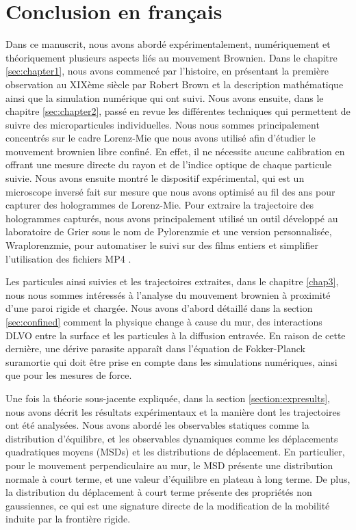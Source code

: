 \section{Conclusion en français}

Dans ce manuscrit, nous avons abordé expérimentalement, numériquement et théoriquement plusieurs aspects liés au mouvement Brownien. Dans le chapitre \ref{sec:chapter1}, nous avons commencé par l'histoire, en présentant la première observation au XIXème siècle par Robert Brown et la description mathématique ainsi que la simulation numérique qui ont suivi. Nous avons ensuite, dans le chapitre \ref{sec:chapter2}, passé en revue les différentes techniques qui permettent de suivre des microparticules individuelles. Nous nous sommes principalement concentrés sur le cadre Lorenz-Mie que nous avons utilisé afin d'étudier le mouvement brownien libre confiné. En effet, il ne nécessite aucune calibration en offrant une mesure directe du rayon et de l'indice optique de chaque particule suivie. Nous avons ensuite montré le dispositif expérimental, qui est un microscope inversé fait sur mesure que nous avons optimisé au fil des ans pour capturer des hologrammes de Lorenz-Mie. Pour extraire la trajectoire des hologrammes capturés, nous avons principalement utilisé un outil développé au laboratoire de Grier sous le nom de Pylorenzmie \href{https://github.com/davidgrier/pylorenzmie}{\faGithub} et une version personnalisée, Wraplorenzmie, pour automatiser le suivi sur des films entiers et simplifier l'utilisation des fichiers MP4 \href{https://github.com/eXpensia/wraplorenzmie}{\faGithub}.

Les particules ainsi suivies et les trajectoires extraites, dans le chapitre \ref{chap3}, nous nous sommes intéressés à l'analyse du mouvement brownien à proximité d'une paroi rigide et chargée. Nous avons d'abord détaillé dans la section \ref{sec:confined} comment la physique change à cause du mur, des interactions DLVO entre la surface et les particules à la diffusion entravée. En raison de cette dernière, une dérive parasite apparaît dans l'équation de Fokker-Planck suramortie qui doit être prise en compte dans les simulations numériques, ainsi que pour les mesures de force.

Une fois la théorie sous-jacente expliquée, dans la section \ref{section:expresults}, nous avons décrit les résultats expérimentaux et la manière dont les trajectoires ont été analysées. Nous avons abordé les observables statiques comme la distribution d'équilibre, et les observables dynamiques comme les déplacements quadratiques moyens (\gls{MSD}s) et les distributions de déplacement. En particulier, pour le mouvement perpendiculaire au mur, le \gls{MSD} présente une distribution normale à court terme, et une valeur d'équilibre en plateau à long terme. De plus, la distribution du déplacement à court terme présente des propriétés non gaussiennes, ce qui est une signature directe de la modification de la mobilité induite par la frontière rigide.

